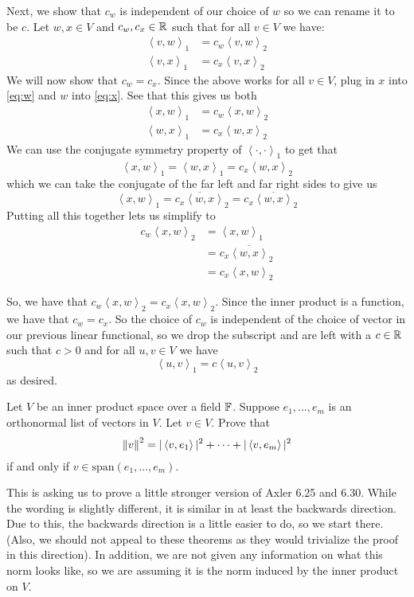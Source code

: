 \documentclass[answers]{exam}
\newcommand{\ip}[1]{\left\langle#1\right\rangle}
\begin{document}
\begin{questions}
\begin{solution}
        Next, we show that $c_w$ is independent of our choice of $w$ so we can rename it to be $c$.
        Let $w,x\in V$ and $c_w,c_x\in\mathbb{R}$ such that for all $v\in V$ we have:
        \begin{align}
            \ip{v,w}_1 &= c_w\ip{v,w}_2 \label{eq:w}\\
            \ip{v,x}_1 &= c_x\ip{v,x}_2 \label{eq:x}
        \end{align}
        We will now show that $c_w = c_x$. Since the above works for all $v\in V$, plug in $x$ into \eqref{eq:w}
        and $w$ into \eqref{eq:x}. See that this gives us both
        \begin{align*}
            \ip{x,w}_1 &= c_w\ip{x,w}_2 \\
            \ip{w,x}_1 &= c_x\ip{w,x}_2
        \end{align*}
        We can use the conjugate symmetry property of $\ip{\cdot,\cdot}_1$ to get that
        \[
            \overline{\ip{x,w}}_1 = \ip{w,x}_1 = c_x\ip{w,x}_2
        \]
        which we can take the conjugate of the far left and far right sides to give us
        \[
            \ip{x,w}_1 = \overline{c_x\ip{w,x}}_2 = c_x\overline{\ip{w,x}}_2
        \]
        Putting all this together lets us simplify to
        \begin{align*}
            c_w\ip{x,w}_2 &= \ip{x,w}_1 \\
            &= c_x\overline{\ip{w,x}}_2 \\
            &= c_x\ip{x,w}_2
        \end{align*}

        So, we have that $c_w\ip{x,w}_2 = c_x\ip{x,w}_2$. Since the inner product is a function, we have that
        $c_w = c_x$. So the choice of $c_w$ is independent of the choice of vector in our previous linear 
        functional, so we drop the subscript and are left with a $c\in\mathbb{R}$ such that $c>0$ and for all $u,v\in V$
        we have
        \[
            \ip{u,v}_1 = c\ip{u,v}_2
        \]
        as desired.
    \end{solution}
    \question Let $V$ be an inner product space over a field $\mathbb{F}$.
    Suppose $e_1,\dots,e_m$ is an orthonormal list of vectors in $V$. Let $v\in V$. Prove that
    \[
        \norm{v}{}^2 = |\ip{v,e_1}|^2 + \cdots + |\ip{v,e_m}|^2
    \]
    if and only if $v\in\text{span}\left({e_1,\dots,e_m}\right)$.
    \begin{solution}

        This is asking us to prove a little stronger version of Axler 6.25 and 6.30. While the
        wording is slightly different, it is similar in at least the backwards direction. Due to this, the 
        backwards direction is a little easier to do, so we start there. (Also, we should not appeal to these 
        theorems as they would trivialize the proof in this direction). In addition, we are not given any 
        information on what this norm looks like, so we are assuming it is the norm induced by the inner product
        on $V$.


\end{solution}
\end{questions}
\end{document}

